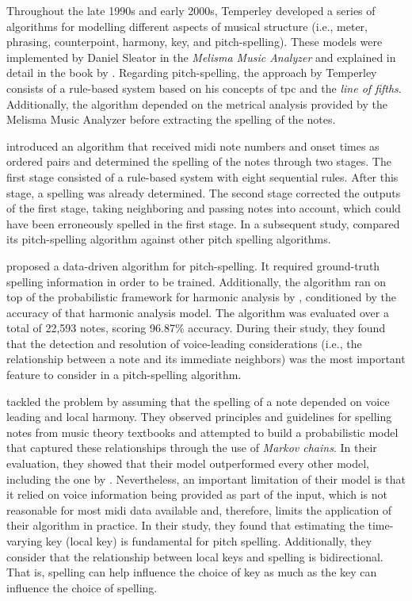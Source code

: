 Throughout the late 1990s and early 2000s, Temperley
developed a series of algorithms for modelling different
aspects of musical structure (i.e., meter, phrasing,
counterpoint, harmony, key, and pitch-spelling). These
models were implemented by Daniel Sleator in the
\emph{Melisma Music Analyzer} and explained in detail in the
book by \textcite{temperley2004cognition}. Regarding
pitch-spelling, the approach by Temperley consists of a
rule-based system based on his concepts of \gls{tpc} and the
\emph{line of fifths}. Additionally, the algorithm depended
on the metrical analysis provided by the Melisma Music
Analyzer before extracting the spelling of the notes.

\textcite{meredith2003pitch} introduced an algorithm that
received \gls{midi} note numbers and onset times as ordered
pairs and determined the spelling of the notes through two
stages. The first stage consisted of a rule-based system
with eight sequential rules. After this stage, a spelling
was already determined. The second stage corrected the
outputs of the first stage, taking neighboring and passing
notes into account, which could have been erroneously
spelled in the first stage. In a subsequent study,
\textcite{meredith2005comparing} compared its pitch-spelling
algorithm against other pitch spelling algorithms.

\textcite{stoddard2004welltempered} proposed a data-driven
algorithm for pitch-spelling. It required ground-truth
spelling information in order to be trained. Additionally,
the algorithm ran on top of the probabilistic framework for
harmonic analysis by \textcite{raphael2003harmonic},
conditioned by the accuracy of that harmonic analysis model.
The algorithm was evaluated over a total of 22,593 notes,
scoring 96.87\% accuracy. During their study, they found
that the detection and resolution of voice-leading
considerations (i.e., the relationship between a note and
its immediate neighbors) was the most important feature to
consider in a pitch-spelling algorithm.

\textcite{teodoru2007pitch} tackled the problem by assuming
that the spelling of a note depended on voice leading and
local harmony. They observed principles and guidelines for
spelling notes from music theory textbooks
\parencite{aldwell1978harmony,rimskykorsakov2005practical}
and attempted to build a probabilistic model that captured
these relationships through the use of \emph{Markov chains}.
In their evaluation, they showed that their model
outperformed every other model, including the one by
\textcite{meredith2006ps13}. Nevertheless, an important
limitation of their model is that it relied on voice
information being provided as part of the input, which is
not reasonable for most \gls{midi} data available and,
therefore, limits the application of their algorithm in
practice. In their study, they found that estimating the
time-varying key (local key) is fundamental for pitch
spelling. Additionally, they consider that the relationship
between local keys and spelling is bidirectional. That is,
spelling can help influence the choice of key as much as the
key can influence the choice of spelling.
